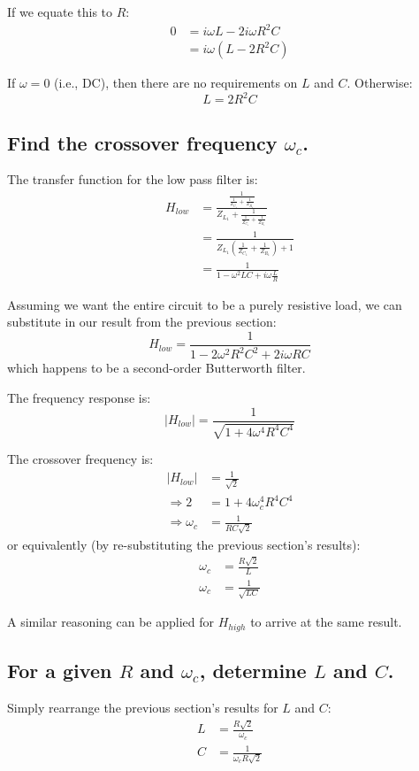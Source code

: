 \documentclass[a4paper]{scrartcl}
\begin{document}
If we equate this to \(R\):
\begin{align*}
    0 &= i \omega L - 2 i \omega R^2 C \\
    &= i \omega (L - 2 R^2 C)
\end{align*}

If \(\omega = 0\) (i.e., DC), then there are no requirements on \(L\) and \(C\). Otherwise:
\[L = 2 R^2 C\]

\subsection{Find the crossover frequency \(\omega_c\).}
The transfer function for the low pass filter is:
\begin{align*}
    H_{low} &= \frac{\frac{1}{\frac{1}{Z_{C_1}} + \frac{1}{Z_{R_1}}}}{Z_{L_1} + \frac{1}{\frac{1}{Z_{C_1}} + \frac{1}{Z_{R_1}}}} \\
    &= \frac{1}{Z_{L_1} \left(\frac{1}{Z_{C_1}} + \frac{1}{Z_{R_1}}\right) + 1} \\
    &= \frac{1}{1 - \omega^2 L C + i \omega \frac{L}{R}}
\end{align*}

Assuming we want the entire circuit to be a purely resistive load, we can substitute in our result from the previous section:
\[H_{low} = \frac{1}{1 - 2 \omega^2 R^2 C^2 + 2 i \omega R C}\]
which happens to be a second-order Butterworth filter.

The frequency response is:
\[|H_{low}| = \frac{1}{\sqrt{1 + 4 \omega^4 R^4 C^4}}\]

The crossover frequency is:
\begin{align*}
    |H_{low}| &= \frac{1}{\sqrt{2}} \\
    \Rightarrow 2 &= 1 + 4 \omega_c^4 R^4 C^4 \\
    \Rightarrow \omega_c &= \frac{1}{R C \sqrt{2}}
\end{align*}
or equivalently (by re-substituting the previous section's results):
\begin{align*}
    \omega_c &= \frac{R \sqrt{2}}{L} \\
    \omega_c &= \frac{1}{\sqrt{L C}}
\end{align*}

A similar reasoning can be applied for \(H_{high}\) to arrive at the same result.

\subsection{For a given \(R\) and \(\omega_c\), determine \(L\) and \(C\).}
Simply rearrange the previous section's results for \(L\) and \(C\):
\begin{align*}
    L &= \frac{R \sqrt{2}}{\omega_c} \\
    C &= \frac{1}{\omega_c R \sqrt{2}}
\end{align*}
\end{document}

